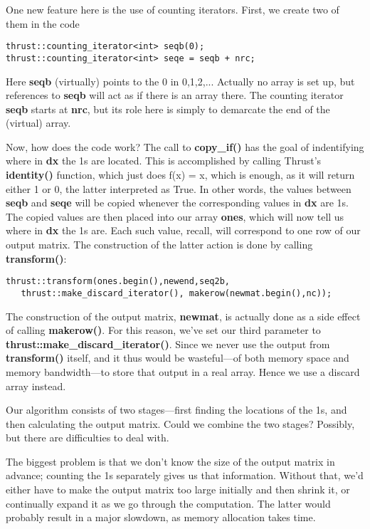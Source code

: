 One new feature here is the use of counting iterators.  First, we
create two of them in the code

\begin{lstlisting}
thrust::counting_iterator<int> seqb(0);
thrust::counting_iterator<int> seqe = seqb + nrc;
\end{lstlisting}

Here {\bf seqb} (virtually) points to the 0 in 0,1,2,...  Actually no
array is set up, but references to {\bf seqb} will act as if there is an
array there.  The counting iterator {\bf seqb} starts at {\bf nrc}, but
its role here is simply to demarcate the end of the (virtual) array.

Now, how does the code work?  The call to {\bf copy\_if()} has the goal
of indentifying where in {\bf dx} the 1s are located.  This is
accomplished by calling Thrust's {\bf identity()} function, which just
does f(x) = x, which is enough, as it will return either 1 or 0, the
latter interpreted as True.  In other words, the values between {\bf
seqb} and {\bf seqe} will be copied whenever the corresponding values in
{\bf dx} are 1s.  The copied values are then placed into our array {\bf
ones}, which will now tell us where in {\bf dx} the 1s are.  Each such
value, recall, will correspond to one row of our output matrix.  The
construction of the latter action is done by calling {\bf transform()}:

\begin{lstlisting}
thrust::transform(ones.begin(),newend,seq2b,
   thrust::make_discard_iterator(), makerow(newmat.begin(),nc));
\end{lstlisting}

The construction of the output matrix, {\bf newmat}, is actually done as
a side effect of calling {\bf makerow()}.  For this reason, we've set
our third parameter to {\bf thrust::make\_discard\_iterator()}.  Since we
never use the output from {\bf transform()} itself, and it thus would be
wasteful---of both memory space and memory bandwidth---to store that
output in a real array.  Hence we use a discard array instead.

Our algorithm consists of two stages---first finding the locations of
the 1s, and then calculating the output matrix.  Could we combine the
two stages?  Possibly, but there are difficulties to deal with.

The biggest problem is that we don't know the size of the output matrix
in advance; counting the 1s separately gives us that information.
Without that, we'd either have to make the output matrix too large
initially and then shrink it, or continually expand it as we go through
the computation.  The latter would probably result in a major slowdown,
as memory allocation takes time.

